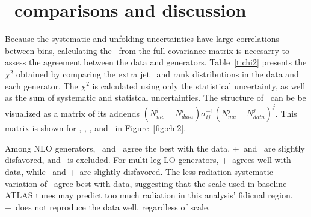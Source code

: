  \section{\chisq\ comparisons and discussion}

Because the systematic and unfolding uncertainties have large correlations between bins,  
calculating the \chisq\ from the full covariance matrix is necesarry to assess the  agreement between the data and generators. Table~\ref{t:chi2} presents the $\chi^2$ obtained by comparing the  extra jet \pt\ and rank distributions in the data and each generator. The $\chi^2$ is calculated using only the statistical uncertainty, as well as the sum of systematic and statistcal uncertainties. The structure of \chisq\ can be be visualized as a matrix of its addends $(N^{i}_{mc}-N^{i}_{data})\sigma^{-1}_{ij}(N^{j}_{mc}-N^{j}_{data})^{j}$. This matrix is shown for \powpy, \hdamp, \madpy, and \peight\ in Figure~\ref{fig:chi2}.

Among NLO generators, \hdamp\ and \powpy\ agree the best with the data. \pow+\hw\ and \peight\ are slightly disfavored, and \mcnlohw\ is excluded. For multi-leg LO generators, \alpg+\py\ agrees well with data, while \madpy\ and \alpg+\hw\ are slightly disfavored. The less radiation systematic variation of \madpy\  agree best with data, suggesting that the scale used in baseline ATLAS tunes may predict too much radiation in this analysis' fidicual region. \acermc+\py\ does not reproduce the data well, regardless of scale.




